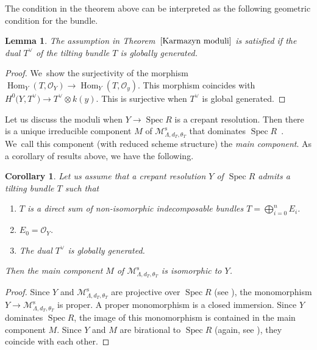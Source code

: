 \documentclass[10pt,a4paper]{amsart}
\DeclareMathOperator{\Hom}{Hom}
\DeclareMathOperator{\Spec}{Spec}
\newcommand{\stsh}{\mathcal{O}}
\numberwithin{equation}{section}
\newtheorem{Corollary}[Theorem]{Corollary}
\newtheorem{Lemma}[Theorem]{Lemma}
\begin{document}
The condition in the theorem above can be interpreted as the following geometric condition for the bundle.

\begin{Lemma}
The assumption in Theorem~$\ref{Karmazyn moduli}$ is satisfied if the dual $T^{\vee}$ of the tilting bundle $T$ is globally generated.
\end{Lemma}

\begin{proof}
We~show the surjectivity of the morphism
$\Hom_Y(T, \stsh_Y) \to \Hom_Y(T, \stsh_y)$.
This morphism coincides with $H^0\big(Y, T^{\vee}\big) \to T^{\vee} \otimes k(y)$.
This is surjective when $T^{\vee}$ is global generated.
\end{proof}

Let us discuss the moduli when $Y \to \Spec R$ is a crepant resolution.
Then there is a unique irreducible component $M$ of $\mathcal{M}_{\Lambda, d_T, \theta_T}^{\mathrm{s}}$ that dominates $\Spec R$~\cite{VdB04b}.
We~call this component (with reduced scheme structure) the \textit{main component}.
As a corollary of results above, we have the following.

\begin{Corollary} \label{cor moduli tilting main comp}
Let us assume that a crepant resolution $Y$ of $\Spec R$ admits a tilting bundle $T$ such that
\begin{enumerate}\itemsep=0pt
\item[$(a)$] $T$ is a direct sum of non-isomorphic indecomposable bundles $T = \bigoplus_{i=0}^n E_i$.
\item[$(b)$] $E_0 = \stsh_Y$.
\item[$(c)$] The dual $T^{\vee}$ is globally generated.
\end{enumerate}
Then the main component $M$ of $\mathcal{M}_{\Lambda, d_T, \theta_T}^{\mathrm{s}}$ is isomorphic to $Y$.
\end{Corollary}

\begin{proof}
Since $Y$ and $\mathcal{M}_{\Lambda, d_T, \theta_T}^{\mathrm{s}}$ are projective over $\Spec R$ (see \cite[Section 6]{VdB04b}),
the monomorphism $Y \to \mathcal{M}_{\Lambda, d_T, \theta_T}^{\mathrm{s}}$ is proper.
A proper monomorphism is a closed immersion.
Since $Y$ dominates $\Spec R$, the image of this monomorphism is contained in the main component $M$.
Since $Y$ and $M$ are birational to $\Spec R$ (again, see \cite[Section~6]{VdB04b}), they coincide with each other.
\end{proof}
\end{document}

